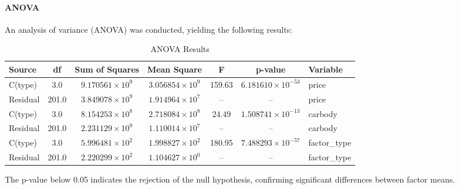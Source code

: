 \documentclass{article}
\begin{document}
\paragraph{ANOVA}
An analysis of variance (ANOVA) was conducted, yielding the following results:
\begin{table}[H]
    \centering
    \caption{ANOVA Results}
    \begin{tabular}{lcccccl}
        \toprule
        \textbf{Source} & \textbf{df} & \textbf{Sum of Squares}  & \textbf{Mean Square}     & \textbf{F} & \textbf{p-value}           & \textbf{Variable} \\
        \midrule
        C(type)         & 3.0         & $9.170561 \times 10^{9}$ & $3.056854 \times 10^{9}$ & 159.63     & $6.181610 \times 10^{-53}$ & price             \\
        Residual        & 201.0       & $3.849078 \times 10^{9}$ & $1.914964 \times 10^{7}$ & --         & --                         & price             \\
        C(type)         & 3.0         & $8.154253 \times 10^{8}$ & $2.718084 \times 10^{8}$ & 24.49      & $1.508741 \times 10^{-13}$ & carbody           \\
        Residual        & 201.0       & $2.231129 \times 10^{9}$ & $1.110014 \times 10^{7}$ & --         & --                         & carbody           \\
        C(type)         & 3.0         & $5.996481 \times 10^{2}$ & $1.998827 \times 10^{2}$ & 180.95     & $7.488293 \times 10^{-57}$ & factor\_type      \\
        Residual        & 201.0       & $2.220299 \times 10^{2}$ & $1.104627 \times 10^{0}$ & --         & --                         & factor\_type      \\
        \bottomrule
    \end{tabular}
\end{table}
The p-value below 0.05 indicates the rejection of the null hypothesis, confirming significant differences between factor means.
\end{document}
